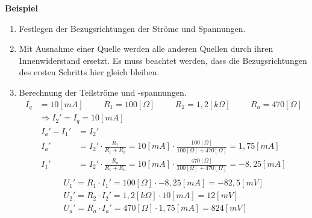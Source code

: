 \textbf{Beispiel} \\
\begin{enumerate}
    \item Festlegen der Bezugsrichtungen der Ströme und Spannungen.
    \item Mit Ausnahme einer Quelle werden alle anderen Quellen durch ihren Innenwiderstand ersetzt. Es muss beachtet werden, dass die Bezugsrichtungen des ersten Schritts hier gleich bleiben.
    \item Berechnung der Teilströme und -spannungen.
    \begin{align}
        I_q &= 10[mA] \hspace{1cm} R_1 = 100[\Omega] \hspace{1cm} R_2 = 1,2[k\Omega] \hspace{1cm} R_a = 470[\Omega] \\
        &\Rightarrow I_2' = I_q = 10[mA]
    \end{align}
    \begin{align}
        I_a' - I_1' &= I_2' \\
        I_a' &= I_2' \cdot \frac{R_1}{R_1 + R_a} = 10[mA] \cdot \frac{100 [\Omega]}{100 [\Omega] + 470[\Omega]} = 1,75[mA] \\
        I_1' &= I_2' \cdot \frac{R_a}{R_1 + R_a} = 10[mA] \cdot \frac{470 [\Omega]}{100 [\Omega] + 470[\Omega]} = -8,25[mA] \\
    \end{align}
    \begin{align}
        U_1' = R_1 \cdot I_1' = 100 [\Omega] \cdot -8,25[mA] = -82,5[mV] \\
        U_2' = R_2 \cdot I_2' = 1,2 [k\Omega] \cdot 10[mA] = 12[mV] \\
        U_a' = R_a \cdot I_a' = 470 [\Omega] \cdot 1,75[mA] = 824[mV]        
    \end{align}


\end{enumerate}
